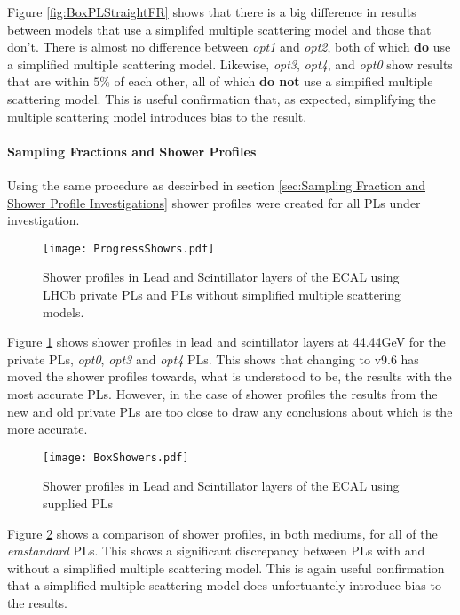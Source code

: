 Figure \ref{fig:BoxPLStraightFR} shows that there is a big difference in results between models that use a simplifed multiple scattering model and those that don't.  There is almost no difference between \textit{opt1} and \textit{opt2}, both of which \textbf{do} use a simplified multiple scattering model.  Likewise, \textit{opt3}, \textit{opt4}, and \textit{opt0} show results that are within $5\%$ of each other, all of which \textbf{do not} use a simpified multiple scattering model.  This is useful confirmation that, as expected, simplifying the multiple scattering model introduces bias to the result.

\paragraph{Sampling Fractions and Shower Profiles} 
Using the same procedure as descirbed in section \ref{sec:Sampling Fraction and Shower Profile Investigations} shower profiles were created for all PLs under investigation.  
\begin{figure}[h]
  \centering
  \texttt{[image: ProgressShowrs.pdf]}
  \caption{Shower profiles in Lead and Scintillator layers of the ECAL using LHCb private PLs and \geant PLs without simplified multiple scattering models.}
  \label{fig:LHCbPLShowers}
\end{figure}

Figure \ref{fig:LHCbPLShowers} shows shower profiles in lead and scintillator layers at 44.44GeV for the \lhcb private PLs, \textit{opt0}, \textit{opt3} and \textit{opt4} PLs.  This shows that changing to \geant v9.6 has moved the shower profiles towards, what is understood to be, the results with the most accurate PLs.  However, in the case of shower profiles the results from the new and old \lhcb private PLs are too close to draw any conclusions about which is the more accurate.

\begin{figure}[h]
  \centering
  \texttt{[image: BoxShowers.pdf]}
  \caption{Shower profiles in Lead and Scintillator layers of the ECAL using \geant supplied PLs}
  \label{fig:BoxPLShowers}
\end{figure}

Figure \ref{fig:BoxPLShowers} shows a comparison of shower profiles, in both mediums, for all of the \textit{emstandard} PLs.  This shows a significant discrepancy between PLs with and without a simplified multiple scattering model.  This is again useful confirmation that a simplified multiple scattering model does unfortuantely introduce bias to the results.


